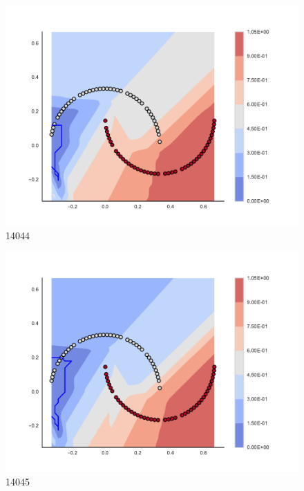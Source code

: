 \begin{subfigure}[b]{0.09\textwidth}
    \includegraphics[clip, trim=2.35cm 1.75cm 4.5cm 0cm,width=\textwidth]{img/convergence/14044.pdf}
    \caption{14044}
    \label{fig:convergence_14044}
\end{subfigure}
%
\begin{subfigure}[b]{0.09\textwidth}
    \includegraphics[clip, trim=2.35cm 1.75cm 4.5cm 0cm,width=\textwidth]{img/convergence/14045.pdf}
    \caption{14045}
    \label{fig:convergence_14045}
\end{subfigure}
%
